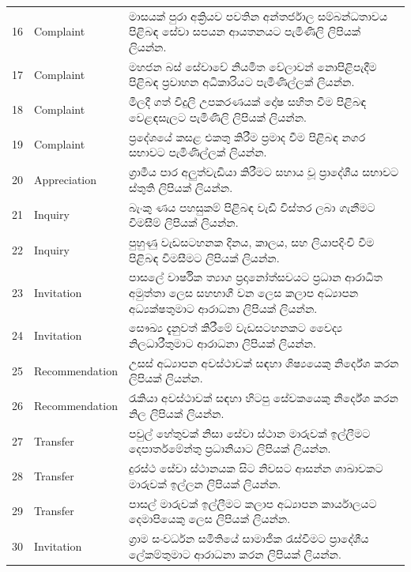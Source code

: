 \documentclass[12pt]{uomthesis}
\begin{document}
\begin{appendices}
\begin{longtable}{@{}p{1.2cm}p{2.6cm}>{\sinhalafont\raggedright\arraybackslash}p{10.8cm}@{}}
16 & Complaint & මාසයක් පුරා අක්‍රියව පවතින අන්තර්ජාල සම්බන්ධතාවය පිළිබඳ සේවා සපයන ආයතනයට පැමිණිලි ලිපියක් ලියන්න. \\
17 & Complaint & මහජන බස් සේවාවේ නියමිත වේලාවන් නොපිළිපැදීම පිළිබඳ ප්‍රවාහන අධිකාරියට පැමිණිල්ලක් ලියන්න. \\
18 & Complaint & මිලදී ගත් විදුලි උපකරණයක් දෝෂ සහිත වීම පිළිබඳ වෙළඳසැලට පැමිණිලි ලිපියක් ලියන්න. \\
19 & Complaint & ප්‍රදේශයේ කසළ එකතු කිරීම ප්‍රමාද වීම පිළිබඳ නගර සභාවට පැමිණිල්ලක් ලියන්න. \\
20 & Appreciation & ග්‍රාමීය පාර අලුත්වැඩියා කිරීමට සහාය වූ ප්‍රාදේශීය සභාවට ස්තුති ලිපියක් ලියන්න. \\
21 & Inquiry & බැංකු ණය පහසුකම් පිළිබඳ වැඩි විස්තර ලබා ගැනීමට විමසීම් ලිපියක් ලියන්න. \\
22 & Inquiry & පුහුණු වැඩසටහනක දිනය, කාලය, සහ ලියාපදිංචි වීම පිළිබඳ විමසීමට ලිපියක් ලියන්න. \\
23 & Invitation & පාසලේ වාර්ෂික ත්‍යාග ප්‍රදානෝත්සවයට ප්‍රධාන ආරාධිත අමුත්තා ලෙස සහභාගී වන ලෙස කලාප අධ්‍යාපන අධ්‍යක්ෂතුමාට ආරාධනා ලිපියක් ලියන්න. \\
24 & Invitation & සෞඛ්‍ය දැනුවත් කිරීමේ වැඩසටහනකට වෛද්‍ය නිලධාරීතුමාට ආරාධනා ලිපියක් ලියන්න. \\
25 & Recommendation & උසස් අධ්‍යාපන අවස්ථාවක් සඳහා ශිෂ්‍යයෙකු නිර්දේශ කරන ලිපියක් ලියන්න. \\
26 & Recommendation & රැකියා අවස්ථාවක් සඳහා හිටපු සේවකයෙකු නිර්දේශ කරන නිල ලිපියක් ලියන්න. \\
27 & Transfer & පවුල් හේතුවක් නිසා සේවා ස්ථාන මාරුවක් ඉල්ලීමට දෙපාර්තමේන්තු ප්‍රධානියාට ලිපියක් ලියන්න. \\
28 & Transfer & දුරස්ථ සේවා ස්ථානයක සිට නිවසට ආසන්න ශාඛාවකට මාරුවක් ඉල්ලන ලිපියක් ලියන්න. \\
29 & Transfer & පාසල් මාරුවක් ඉල්ලීමට කලාප අධ්‍යාපන කාර්යාලයට දෙමාපියෙකු ලෙස ලිපියක් ලියන්න. \\
30 & Invitation & ග්‍රාම සංවර්ධන සමිතියේ සාමාජික රැස්වීමට ප්‍රාදේශීය ලේකම්තුමාට ආරාධනා කරන ලිපියක් ලියන්න. \\
\bottomrule
\end{longtable}

\end{appendices}
\end{document}
